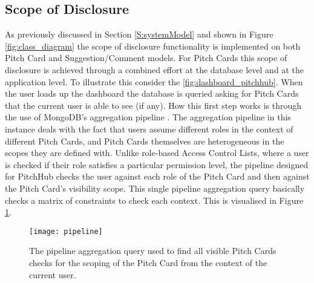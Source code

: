 \subsection{Scope of Disclosure}
As previously discussed in Section \ref{S:systemModel} and shown in Figure \ref{fig:class_diagram} the scope of disclosure functionality is implemented on both Pitch Card and Suggestion/Comment models. For Pitch Cards this scope of disclosure is achieved through a combined effort at the database level and at the application level. To illustrate this consider the \ref{fig:dashboard_pitchhub}. When the user loads up the dashboard the database is queried asking for Pitch Cards that the current user is able to see (if any). How this first step works is through the use of MongoDB's aggregation pipeline \cite{Aggre7:online}. The aggregation pipeline in this instance deals with the fact that users assume different roles in the context of different Pitch Cards, and Pitch Cards themselves are heterogeneous in the scopes they are defined with. Unlike role-based Access Control Lists, where a user is checked if their role satisfies a particular permission level, the pipeline designed for PitchHub checks the user against each role of the Pitch Card and then against the Pitch Card's visibility scope. This single pipeline aggregation query basically checks a matrix of constraints to check each context. This is visualised in Figure \ref{fig:pipeline}.

\begin{figure}[ht]
    \centering
    \texttt{[image: pipeline]}
    \caption{The pipeline aggregation query used to find all visible Pitch Cards checks for the scoping of the Pitch Card from the context of the current user.}
    \label{fig:pipeline}
\end{figure}

